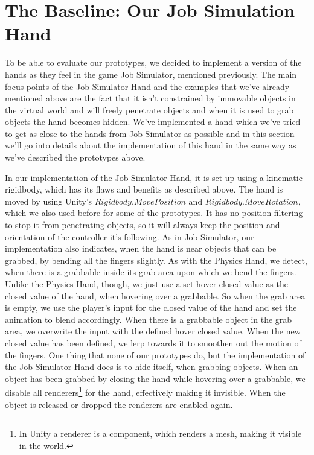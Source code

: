\section{The Baseline: Our Job Simulation Hand}
To be able to evaluate our prototypes, we decided to implement a version of the hands as they feel in the game Job Simulator, mentioned previously. The main focus points of the Job Simulator Hand and the examples that we've already mentioned above are the fact that it isn't constrained by immovable objects in the virtual world and will freely penetrate objects and when it is used to grab objects the hand becomes hidden. We've implemented a hand which we've tried to get as close to the hands from Job Simulator as possible and in this section we'll go into details about the implementation of this hand in the same way as we've described the prototypes above.

In our implementation of the Job Simulator Hand, it is set up using a kinematic rigidbody, which has its flaws and benefits as described above. The hand is moved by using Unity's $Rigidbody.MovePosition$ and $Rigidbody.MoveRotation$, which we also used before for some of the prototypes. It has no position filtering to stop it from penetrating objects, so it will always keep the position and orientation of the controller it's following. As in Job Simulator, our implementation also indicates, when the hand is near objects that can be grabbed, by bending all the fingers slightly. As with the Physics Hand, we detect, when there is a grabbable inside its grab area upon which we bend the fingers. Unlike the Physics Hand, though, we just use a set hover closed value as the closed value of the hand, when hovering over a grabbable. So when the grab area is empty, we use the player's input for the closed value of the hand and set the animation to blend accordingly. When there is a grabbable object in the grab area, we overwrite the input with the defined hover closed value. When the new closed value has been defined, we lerp towards it to smoothen out the motion of the fingers. One thing that none of our prototypes do, but the implementation of the Job Simulator Hand does is to hide itself, when grabbing objects. When an object has been grabbed by closing the hand while hovering over a grabbable, we disable all renderers\footnote{In Unity a renderer is a component, which renders a mesh, making it visible in the world.} for the hand, effectively making it invisible. When the object is released or dropped the renderers are enabled again.

